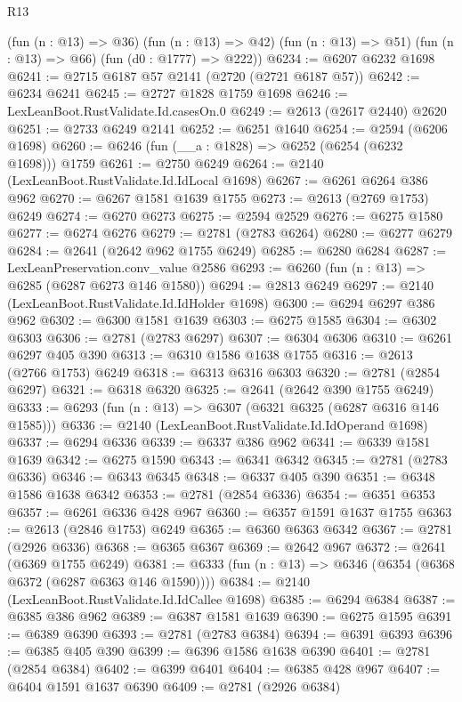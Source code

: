 \begin{lexlean}{R13}
\begin{coremodule}
      (fun (n : @13) => @36)
      (fun (n : @13) => @42)
      (fun (n : @13) => @51)
      (fun (n : @13) => @66)
      (fun (d0 : @1777) => @222))
@6234 := @6207 @6232 @1698
@6241 := @2715 @6187 @57 @2141 (@2720 (@2721 @6187 @57))
@6242 := @6234 @6241
@6245 := @2727 @1828 @1759 @1698
@6246 := LexLeanBoot.RustValidate.Id.casesOn.{0}
@6249 := @2613 (@2617 @2440) @2620
@6251 := @2733 @6249 @2141
@6252 := @6251 @1640
@6254 := @2594 (@6206 @1698)
@6260 := @6246 (fun (__a : @1828) => @6252 (@6254 (@6232 @1698))) @1759
@6261 := @2750 @6249
@6264 := @2140 (LexLeanBoot.RustValidate.Id.IdLocal @1698)
@6267 := @6261 @6264 @386 @962
@6270 := @6267 @1581 @1639 @1755
@6273 := @2613 (@2769 @1753) @6249
@6274 := @6270 @6273
@6275 := @2594 @2529
@6276 := @6275 @1580
@6277 := @6274 @6276
@6279 := @2781 (@2783 @6264)
@6280 := @6277 @6279
@6284 := @2641 (@2642 @962 @1755 @6249)
@6285 := @6280 @6284
@6287 := LexLeanPreservation.conv_value @2586
@6293 := @6260 (fun (n : @13) => @6285 (@6287 @6273 @146 @1580))
@6294 := @2813 @6249
@6297 := @2140 (LexLeanBoot.RustValidate.Id.IdHolder @1698)
@6300 := @6294 @6297 @386 @962
@6302 := @6300 @1581 @1639
@6303 := @6275 @1585
@6304 := @6302 @6303
@6306 := @2781 (@2783 @6297)
@6307 := @6304 @6306
@6310 := @6261 @6297 @405 @390
@6313 := @6310 @1586 @1638 @1755
@6316 := @2613 (@2766 @1753) @6249
@6318 := @6313 @6316 @6303
@6320 := @2781 (@2854 @6297)
@6321 := @6318 @6320
@6325 := @2641 (@2642 @390 @1755 @6249)
@6333 := @6293 (fun (n : @13) => @6307 (@6321 @6325 (@6287 @6316 @146 @1585)))
@6336 := @2140 (LexLeanBoot.RustValidate.Id.IdOperand @1698)
@6337 := @6294 @6336
@6339 := @6337 @386 @962
@6341 := @6339 @1581 @1639
@6342 := @6275 @1590
@6343 := @6341 @6342
@6345 := @2781 (@2783 @6336)
@6346 := @6343 @6345
@6348 := @6337 @405 @390
@6351 := @6348 @1586 @1638 @6342
@6353 := @2781 (@2854 @6336)
@6354 := @6351 @6353
@6357 := @6261 @6336 @428 @967
@6360 := @6357 @1591 @1637 @1755
@6363 := @2613 (@2846 @1753) @6249
@6365 := @6360 @6363 @6342
@6367 := @2781 (@2926 @6336)
@6368 := @6365 @6367
@6369 := @2642 @967
@6372 := @2641 (@6369 @1755 @6249)
@6381 := @6333 (fun (n : @13) => @6346 (@6354 (@6368 @6372 (@6287 @6363 @146 @1590))))
@6384 := @2140 (LexLeanBoot.RustValidate.Id.IdCallee @1698)
@6385 := @6294 @6384
@6387 := @6385 @386 @962
@6389 := @6387 @1581 @1639
@6390 := @6275 @1595
@6391 := @6389 @6390
@6393 := @2781 (@2783 @6384)
@6394 := @6391 @6393
@6396 := @6385 @405 @390
@6399 := @6396 @1586 @1638 @6390
@6401 := @2781 (@2854 @6384)
@6402 := @6399 @6401
@6404 := @6385 @428 @967
@6407 := @6404 @1591 @1637 @6390
@6409 := @2781 (@2926 @6384)

\end{coremodule}
\end{lexlean}
